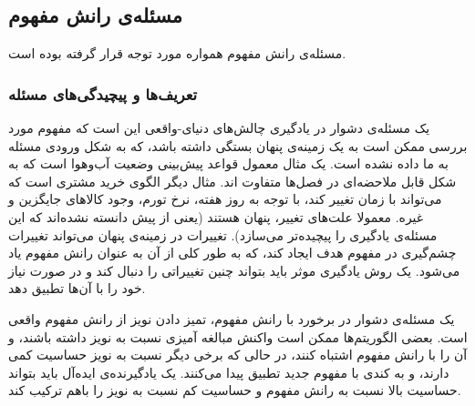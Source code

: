
% 
%
%
%
%
%
%
%
%
%
%
%


\subsection{
مسئله‌ی رانش مفهوم
}
مسئله‌ی رانش مفهوم
 \cite{problemofconceptdrifttsymbal} 
همواره مورد توجه قرار گرفته بوده است.




\subsubsection{
تعریف‌ها و پیچیدگی‌های مسئله
} 
یک مسئله‌ی دشوار در یادگیری چالش‌های دنیای-واقعی این است که مفهوم
مورد بررسی ممکن است به یک زمینه‌ی پنهان
بستگی داشته باشد، که به شکل ورودی مسئله به ما داده نشده است. یک مثال معمول قواعد پیش‌بینی وضعیت آب‌وهوا است که به شکل قابل ملاحضه‌ای در فصل‌ها متفاوت اند. مثال دیگر الگوی خرید مشتری است که می‌تواند با زمان تغییر کند، با توجه به روز هفته، نرخ تورم، وجود کالاهای جایگزین و غیره. معمولا علت‌های تغییر، پنهان هستند (یعنی از پیش دانسته نشده‌اند که این مسئله‌ی یادگیری را پیچیده‌تر می‌سازد). تغییرات در زمینه‌ی پنهان می‌تواند تغییرات چشم‌گیری در مفهوم هدف
ایجاد کند، که به طور کلی از آن به عنوان رانش مفهوم
یاد می‌شود. یک روش یادگیری موثر باید بتواند چنین تغییراتی را دنبال کند و در صورت نیاز خود را با آن‌ها تطبیق دهد.


یک مسئله‌ی دشوار در برخورد با رانش مفهوم، تمیز دادن نویز
از رانش مفهوم واقعی است. بعضی الگوریتم‌ها
ممکن است واکنش مبالغه آمیزی نسبت به نویز داشته باشند، و آن را با رانش مفهوم اشتباه کنند، در حالی که برخی دیگر نسبت به نویز حساسیت کمی دارند، و به کندی با مفهوم جدید تطبیق پیدا می‌کنند. یک یادگیرنده‌ی
ایده‌آل باید بتواند حساسیت بالا نسبت به رانش مفهوم و حساسیت کم نسبت به نویز را باهم ترکیب کند.

